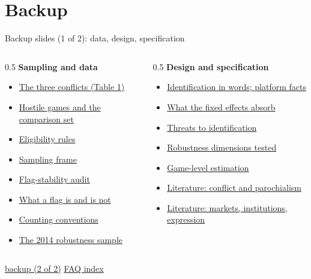 \documentclass[aspectratio=169,11pt,t]{beamer}
\newcommand{\links}[1]{\vfill\hfill{#1}}
\begin{document}
\appendix
\section{Backup}

\begin{frame}[label=backup-index]{Backup slides (1 of 2): data, design, specification}
  \footnotesize
  \begin{columns}[T]
    \begin{column}{0.5\textwidth}
      \textbf{Sampling and data}
      \begin{itemize}
        \item \hyperlink{bk-table1-main}{The three conflicts (Table 1)}
        \item \hyperlink{bk-hostile}{Hostile games and the comparison set}
        \item \hyperlink{bk-eligibility}{Eligibility rules}
        \item \hyperlink{bk-frame}{Sampling frame}
        \item \hyperlink{bk-flags}{Flag-stability audit}
        \item \hyperlink{bk-flagmeaning}{What a flag is and is not}
        \item \hyperlink{bk-table1}{Counting conventions}
        \item \hyperlink{bk-2014}{The 2014 robustness sample}
      \end{itemize}
    \end{column}
    \begin{column}{0.5\textwidth}
      \textbf{Design and specification}
      \begin{itemize}
        \item \hyperlink{bk-ident}{Identification in words; platform facts}
        \item \hyperlink{bk-fe}{What the fixed effects absorb}
        \item \hyperlink{threats}{Threats to identification}
        \item \hyperlink{bk-robust}{Robustness dimensions tested}
        \item \hyperlink{bk-gamelevel}{Game-level estimation}
        \item \hyperlink{bk-lit1}{Literature: conflict and parochialism}
        \item \hyperlink{bk-lit2}{Literature: markets, institutions, expression}
      \end{itemize}
    \end{column}
  \end{columns}
  \links{\hyperlink{backup-index2}{\textcolor{linkblue}{\scriptsize\textsf{backup (2 of 2)}}} \quad \hyperlink{faq-index}{\textcolor{linkblue}{\scriptsize\textsf{FAQ index}}}}
\end{frame}
\end{document}
